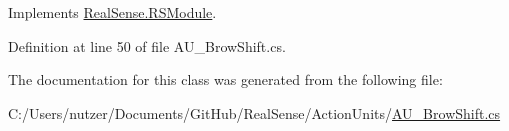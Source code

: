 Implements \hyperlink{class_real_sense_1_1_r_s_module_a2ec830b7932ee7c0077d473f81c73867}{Real\+Sense.\+R\+S\+Module}.



Definition at line 50 of file A\+U\+\_\+\+Brow\+Shift.\+cs.



The documentation for this class was generated from the following file\+:\begin{DoxyCompactItemize}
\item 
C\+:/\+Users/nutzer/\+Documents/\+Git\+Hub/\+Real\+Sense/\+Action\+Units/\hyperlink{_a_u___brow_shift_8cs}{A\+U\+\_\+\+Brow\+Shift.\+cs}\end{DoxyCompactItemize}
